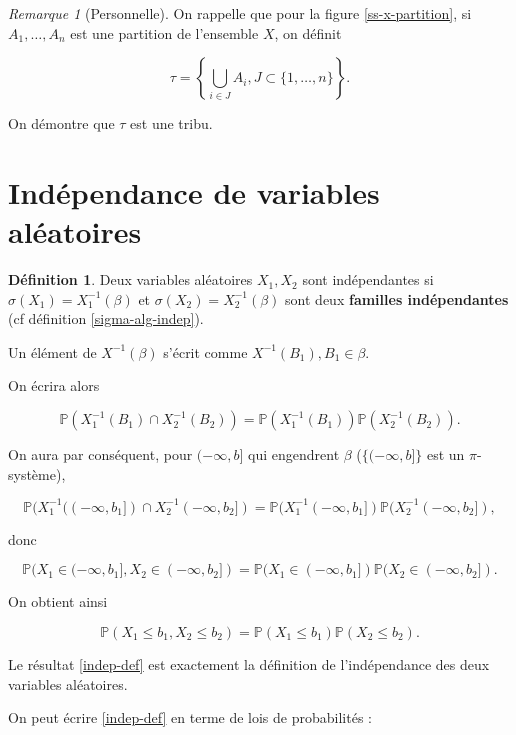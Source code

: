 \documentclass[french]{book}
\theoremstyle{definition}
\newtheorem{protodefinition}{Définition}[section]
\newenvironment{definition}
    {\colorlet{shadecolor}{green!5}\begin{shaded}\begin{protodefinition}}
    {\end{protodefinition}\end{shaded}}
\theoremstyle{remark}
\newtheorem*{remark}{Remarque}
\begin{document}
\begin{remark}[Personnelle]
  On rappelle que pour la figure \ref{ss-x-partition}, si \(A_1, \dots, A_n\) est une partition de l'ensemble \(X\), on définit

  \[
  \tau = \left\{ \bigcup _{i \in J} A_i, J \subset \{ 1, \dots, n \} \right\}.
  \]

  On démontre que $\tau$ est une tribu.
\end{remark}

\section{Indépendance de variables aléatoires}


\begin{definition}
  Deux variables aléatoires $X_1, X_2$ sont indépendantes si $\sigma(X_1) = X_1 ^{-1} (\beta )$ et $\sigma(X_2) = X_2 ^{-1} (\beta )$ sont deux \textbf{familles indépendantes} (cf définition \ref{sigma-alg-indep}).
\end{definition}

Un élément de $X ^{-1} (\beta )$ s'écrit comme $X ^{-1} (B_1), B_1 \in \beta$.

On écrira alors

\[
\mathbb{P}(X_1 ^{-1} (B_1) \cap X_2 ^{-1} (B_2)) = \mathbb{P}(X_1 ^{-1} (B_1)) \mathbb{P}(X_2 ^{-1} (B_2)).
\]

On aura par conséquent, pour $(-\infty, b]$ qui engendrent $\beta$ (\( \{ (-\infty, b] \} \) est un \(\pi\)-système),

\[\mathbb{P}(X_1 ^{-1} ((-\infty,b_1]) \cap X_2 ^{-1} (-\infty,b_2]) = \mathbb{P}(X_1 ^{-1} (-\infty,b_1]) \mathbb{P}(X_2 ^{-1} (-\infty, b_2]), \]

donc

\[\mathbb{P}(X_1 \in (-\infty, b_1], X_2 \in (-\infty, b_2]) = \mathbb{P}(X_1 \in (-\infty,b_1]) \mathbb{P}(X_2 \in (-\infty, b_2]).\]

On obtient ainsi

\begin{equation}
  \mathbb{P}(X_1 \leq b_1, X_2 \leq b_2)  = \mathbb{P}(X_1 \leq b_1) \mathbb{P}(X_2 \leq b_2). \label{indep-def}
\end{equation}



Le résultat \ref{indep-def} est exactement la définition de l'indépendance des deux variables aléatoires.

On peut écrire \ref{indep-def} en terme de lois de probabilités :
\end{document}
